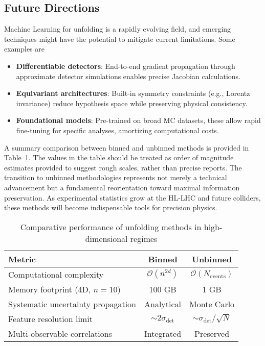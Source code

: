 \subsection{Future Directions}  
Machine Learning for unfolding is a rapidly evolving field, and emerging techniques might have the potential to mitigate current limitations. Some examples are
\begin{itemize}
    \item \textbf{Differentiable detectors}: End-to-end gradient propagation through approximate detector simulations enables precise Jacobian calculations.
    \item \textbf{Equivariant architectures}: Built-in symmetry constraints (e.g., Lorentz invariance) reduce hypothesis space while preserving physical consistency.
    \item \textbf{Foundational models}: Pre-trained on broad MC datasets, these allow rapid fine-tuning for specific analyses, amortizing computational costs.
\end{itemize}

A summary comparison between binned and unbinned methods is provided in Table~\ref{tab:binned_vs_unbinned}.
%
The values in the table should be treated as order of magnitude estimates provided to suggest rough scales, rather than precise reports.
%
The transition to unbinned methodologies represents not merely a technical advancement but a fundamental reorientation toward maximal information preservation. As experimental statistics grow at the HL-LHC and future colliders, these methods will become indispensable tools for precision physics.

\begin{table}
\centering
\begin{tabular}{lcc}
\hline
\textbf{Metric} & \textbf{Binned} & \textbf{Unbinned} \\
\hline
Computational complexity & \(\mathcal{O}(n^{2d})\) & \(\mathcal{O}(N_{\text{events}})\) \\
Memory footprint (4D, \(n=10\)) & 100 GB & 1 GB \\
Systematic uncertainty propagation & Analytical & Monte Carlo \\
Feature resolution limit & \(\sim 2\sigma_{\text{det}}\) & \(\sim \sigma_{\text{det}}/\sqrt{N}\) \\
Multi-observable correlations & Integrated & Preserved \\
\hline
\end{tabular}
\caption{Comparative performance of unfolding methods in high-dimensional regimes}
\label{tab:binned_vs_unbinned}
\end{table}

